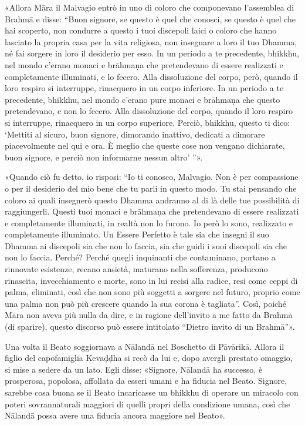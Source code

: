 «Allora Māra il Malvagio entrò in uno di coloro che componevano l’assemblea di
Brahmā e disse: “Buon signore, se questo è quel che conosci, se questo è quel
che hai scoperto, non condurre a questo i tuoi discepoli laici o coloro che
hanno lasciato la propria casa per la vita religiosa, non insegnare a loro il
tuo Dhamma, né fai sorgere in loro il desiderio per esso. In un periodo a te
precedente, bhikkhu, nel mondo c’erano monaci e brāhmaṇa che pretendevano di
essere realizzati e completamente illuminati, e lo fecero. Alla dissoluzione del
corpo, però, quando il loro respiro si interruppe, rinacquero in un corpo
inferiore. In un periodo a te precedente, bhikkhu, nel mondo c’erano pure monaci
e brāhmaṇa che questo pretendevano, e non lo fecero. Alla dissoluzione del
corpo, quando il loro respiro si interruppe, rinacquero in un corpo superiore.
Perciò, bhikkhu, questo ti dico: ‘Mettiti al sicuro, buon signore, dimorando
inattivo, dedicati a dimorare piacevolmente nel qui e ora. È meglio che queste
cose non vengano dichiarate, buon signore, e perciò non informarne nessun altro’
”».

«Quando ciò fu detto, io risposi: “Io ti conosco, Malvagio. Non è per
compassione o per il desiderio del mio bene che tu parli in questo modo. Tu stai
pensando che coloro ai quali insegnerò questo Dhamma andranno al di là delle tue
possibilità di raggiungerli. Questi tuoi monaci e brāhmaṇa che pretendevano di
essere realizzati e completamente illuminati, in realtà non lo furono. Io però
lo sono, realizzato e completamente illuminato. Un Essere Perfetto è tale sia
che insegni il suo Dhamma ai discepoli sia che non lo faccia, sia che guidi i
suoi discepoli sia che non lo faccia. Perché? Perché quegli inquinanti che
contaminano, portano a rinnovate esistenze, recano ansietà, maturano nella
sofferenza, producono rinascita, invecchiamento e morte, sono in lui recisi alla
radice, resi come ceppi di palma, eliminati, così che non sono più soggetti a
sorgere nel futuro, proprio come una palma non può più crescere quando la sua
corona è tagliata”. Così, poiché Māra non aveva più nulla da dire, e in ragione
dell’invito a me fatto da Brahmā (di sparire), questo discorso può essere
intitolato “Dietro invito di un Brahmā”».


Una volta il Beato soggiornava a Nālandā nel Boschetto di Pāvārikā. Allora il
figlio del capofamiglia Kevaḍḍha si recò da lui e, dopo avergli prestato
omaggio, si mise a sedere da un lato. Egli disse: «Signore, Nālandā ha successo,
è prosperosa, popolosa, affollata da esseri umani e ha fiducia nel Beato.
Signore, sarebbe cosa buona se il Beato incaricasse un bhikkhu di operare un
miracolo con poteri sovrannaturali maggiori di quelli propri della condizione
umana, così che Nālandā possa avere una fiducia ancora maggiore nel Beato».

